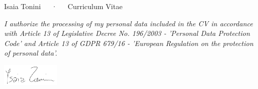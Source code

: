 \documentclass[11pt, a4paper]{awesome-cv}
\begin{document}
  \makecvheader[C]

  \makecvfooter {\today} {{Isaia Tonini}~~~·~~~Curriculum Vitae} {\thepage}

  
  
  
  
  
  
  

  \newcommand{\datipersonali}{\footnotesize
  \color{gray}
  \itshape I authorize the processing of my personal data included in the CV in
  accordance with Article 13 of Legislative Decree No. 196/2003 - 'Personal Data
  Protection Code' and Article 13 of GDPR 679/16 - 'European Regulation on the
  protection of personal data'.}

  \vfill %

  \datipersonali\\[2ex] \hfill
  \begin{minipage}[b]{0.95\textwidth}
    \hspace*{\fill}
    \includegraphics[width=2.75cm]{
      firma-no-bg.png
    } %
  \end{minipage}

\end{document}
